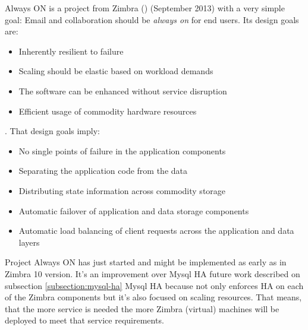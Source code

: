 Always ON is a project from Zimbra (\cite{ZimbraProjectAlwaysOn}) (September 2013) with a very simple goal: Email and collaboration should be \textit{always on} for end users. Its design goals are:
\begin{itemize}
  \item Inherently resilient to failure
  \item Scaling should be elastic based on workload demands
  \item The software can be enhanced without service disruption
  \item Efficient usage of commodity hardware resources
\end{itemize}
. That design goals imply:
\begin{itemize}
  \item No single points of failure in the application components
  \item Separating the application code from the data
  \item Distributing state information across commodity storage
  \item Automatic failover of application and data storage components
  \item Automatic load balancing of client requests across the application and data layers
\end{itemize}

Project Always ON has just started and might be implemented as early as in Zimbra 10 version. It's an improvement over Mysql HA future work described on subsection {\ref{subsection:mysql-ha} Mysql HA} because not only enforces HA on each of the Zimbra components but it's also focused on scaling resources. That means, that the more service is needed the more Zimbra (virtual) machines will be deployed to meet that service requirements.

